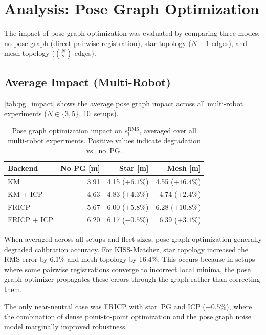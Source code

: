 \section{Analysis: Pose Graph Optimization}
\label{sec:pose_graph_impact}

The impact of pose graph optimization was evaluated by comparing
three modes: no pose graph (direct pairwise registration), star
topology ($N - 1$ edges), and mesh topology ($\binom{N}{2}$ edges).

\subsection{Average Impact (Multi-Robot)}

\autoref{tab:pg_impact} shows the average pose graph impact across
all multi-robot experiments ($N \in \{3, 5\}$, 10~setups).

\begin{table}[htbp]
    \centering
    \caption{Pose graph optimization impact on $e_t^\mathrm{RMS}$,
             averaged over all multi-robot experiments.
             Positive values indicate degradation vs.\ no~PG.}
    \label{tab:pg_impact}
    \begin{tabular}{l r r r}
        \toprule
        \textbf{Backend}
            & \textbf{No PG} [m]
            & \textbf{Star} [m]
            & \textbf{Mesh} [m] \\
        \midrule
        KM           & 3.91  & 4.15 ($+6.1\%$)  & 4.55 ($+16.4\%$)  \\
        KM + ICP     & 4.63  & 4.83 ($+4.3\%$)  & 4.74 ($+2.4\%$)   \\
        FRICP        & 5.67  & 6.00 ($+5.8\%$)  & 6.28 ($+10.8\%$)  \\
        FRICP + ICP  & 6.20  & 6.17 ($-0.5\%$)  & 6.39 ($+3.1\%$)   \\
        \bottomrule
    \end{tabular}
\end{table}

When averaged across all setups and fleet sizes, pose graph
optimization generally degraded calibration accuracy.
For KISS-Matcher, star topology increased the RMS error by 6.1\%
and mesh topology by 16.4\%.
This occurs because in setups where some pairwise registrations
converge to incorrect local minima, the pose graph optimizer
propagates these errors through the graph rather than correcting
them.

The only near-neutral case was FRICP with star~PG and ICP
($-0.5\%$), where the combination of dense point-to-point
optimization and the pose graph noise model marginally improved
robustness.

